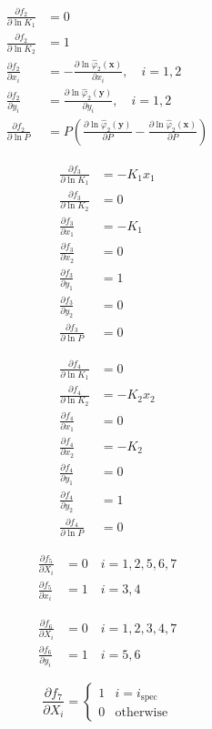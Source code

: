 \documentclass[english]{sintefmemo2012}
\newcommand*{\pd}[2]{\ensuremath{\frac{\partial #1}{\partial{#2}}}}
\newcommand{\spec}{\text{spec}}
\begin{document}
\begin{align}
 \pd{f_2}{\ln K_1}  & = 0 \\
 \pd{f_2}{\ln K_2}  & = 1 \\
 \pd{f_2}{x_i}  & =  - \pd{\ln
 \hat{\varphi}_2\left(\mathbf{x}\right)}{x_i}, \quad
 i=1,2\\
 \pd{f_2}{y_i}  & =  \pd{\ln
 \hat{\varphi}_2\left(\mathbf{y}\right)}{y_i}, \quad
 i=1,2\\
 \pd{f_2}{\ln P}  & =  P\left(\pd{\ln
 \hat{\varphi}_2\left(\mathbf{y}\right)}{P} -\pd{\ln
 \hat{\varphi}_2\left(\mathbf{x}\right)}{P}\right)
\end{align}

\begin{align}
 \pd{f_3}{\ln K_1}  & = -K_1 x_1 \\
 \pd{f_3}{\ln K_2}  & = 0 \\
 \pd{f_3}{x_1}  & =  - K_1 \\
 \pd{f_3}{x_2}  & = 0 \\
 \pd{f_3}{y_1}  & = 1 \\
 \pd{f_3}{y_2}  & = 0 \\
 \pd{f_3}{\ln P}  & = 0
\end{align}

\begin{align}
 \pd{f_4}{\ln K_1}  & = 0 \\
 \pd{f_4}{\ln K_2}  & = -K_2 x_2 \\
 \pd{f_4}{x_1}  & = 0\\
 \pd{f_4}{x_2}  & = - K_2 \\
 \pd{f_4}{y_1}  & = 0 \\
 \pd{f_4}{y_2}  & = 1 \\
 \pd{f_4}{\ln P}  & = 0
\end{align}

\begin{align}
 \pd{f_5}{X_i}  & = 0 \quad i=1,2,5,6,7\\
 \pd{f_5}{x_i}  & = 1 \quad i=3,4
\end{align}

\begin{align}
 \pd{f_6}{X_i}  & = 0 \quad i=1,2,3,4,7\\
 \pd{f_6}{y_i}  & = 1 \quad i=5,6
\end{align}

\begin{equation}
 \pd{f_7}{X_i} =\begin{cases} 1 & i=i_{\spec}\\
   0 & \text{otherwise}
\end{cases}
\end{equation}
\end{document}
